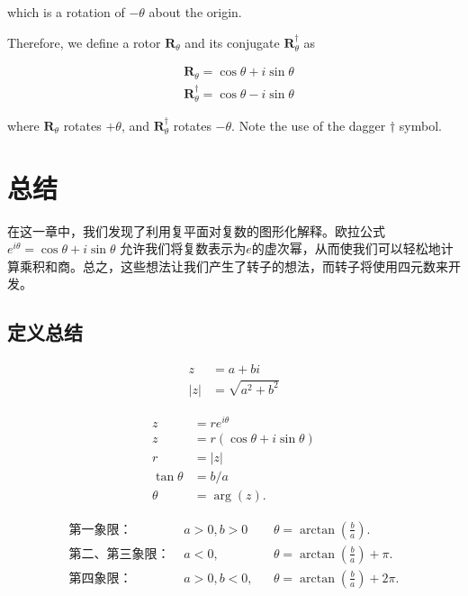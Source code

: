 which is a rotation of $-\theta$ about the origin.

Therefore, we define a rotor $\mathbf{R}_{\theta}$ and its conjugate $\mathbf{R}_{\theta}^{\dagger}$ as

$$
    \begin{aligned}
         & \mathbf{R}_{\theta}=\cos \theta+i \sin \theta           \\
         & \mathbf{R}_{\theta}^{\dagger}=\cos \theta-i \sin \theta
    \end{aligned}
$$

where $\mathbf{R}_{\theta}$ rotates $+\theta$, and $\mathbf{R}_{\theta}^{\dagger}$ rotates $-\theta$. Note the use of the dagger $\dagger$ symbol.

\section{总结}
在这一章中，我们发现了利用复平面对复数的图形化解释。欧拉公式 $e^{i \theta}=\cos \theta+i \sin \theta$ 允许我们将复数表示为$e$的虚次幂，从而使我们可以轻松地计算乘积和商。总之，这些想法让我们产生了转子的想法，而转子将使用四元数来开发。

\subsection{定义总结}
\begin{tcolorbox}[breakable, enhanced,title = {复数}]
    $$
        \begin{aligned}
            z   & =a+b i              \\
            |z| & =\sqrt{a^{2}+b^{2}}
        \end{aligned}
    $$
\end{tcolorbox}

\begin{tcolorbox}[breakable, enhanced,title = {极坐标形式}]
    $$
        \begin{aligned}
            z           & =r e^{i \theta}               \\
            z           & =r(\cos \theta+i \sin \theta) \\
            r           & =|z|                          \\
            \tan \theta & =b / a                        \\
            \theta      & =\arg (z) .
        \end{aligned}
    $$

    $$
        \begin{aligned}
            \text{第一象限：   }     & a>0, b>0  &  & \theta=\arctan \left(\frac{b}{a}\right).       \\
            \text{第二、第三象限： } & a<0,      &  & \theta=\arctan \left(\frac{b}{a}\right)+\pi.   \\
            \text{第四象限：  }      & a>0, b<0, &  & \theta=\arctan \left(\frac{b}{a}\right)+2 \pi.
        \end{aligned}
    $$
\end{tcolorbox}

